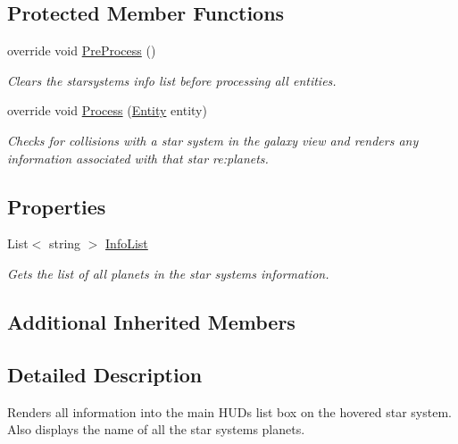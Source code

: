 \subsection*{Protected Member Functions}
\begin{DoxyCompactItemize}
\item 
override void \hyperlink{class_midnight_blue_1_1_galaxy_render_system_a269f042fe0c55e47f3b23cc1930ed71a}{Pre\+Process} ()
\begin{DoxyCompactList}\small\item\em Clears the starsystems info list before processing all entities. \end{DoxyCompactList}\item 
override void \hyperlink{class_midnight_blue_1_1_galaxy_render_system_aabbf61a4bcfb7c026d2d0c9fbe90569f}{Process} (\hyperlink{class_midnight_blue_1_1_engine_1_1_entity_component_1_1_entity}{Entity} entity)
\begin{DoxyCompactList}\small\item\em Checks for collisions with a star system in the galaxy view and renders any information associated with that star re\+:planets. \end{DoxyCompactList}\end{DoxyCompactItemize}
\subsection*{Properties}
\begin{DoxyCompactItemize}
\item 
List$<$ string $>$ \hyperlink{class_midnight_blue_1_1_galaxy_render_system_a2f252c64ec38b5bcf20c6b276fd5809b}{Info\+List}
\begin{DoxyCompactList}\small\item\em Gets the list of all planets in the star system\textquotesingle{}s information. \end{DoxyCompactList}\end{DoxyCompactItemize}
\subsection*{Additional Inherited Members}


\subsection{Detailed Description}
Renders all information into the main H\+UD\textquotesingle{}s list box on the hovered star system. Also displays the name of all the star systems planets. 



